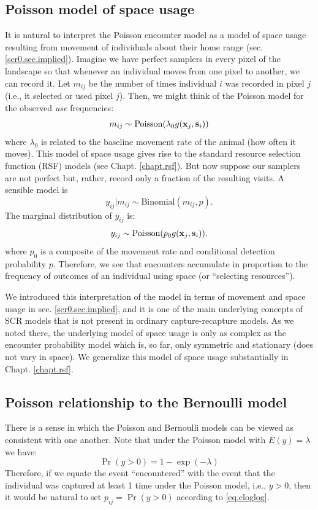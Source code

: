 \subsection{Poisson model of space usage}

It is natural to interpret the Poisson encounter model as a model of
space usage
resulting from movement of individuals
about their home range (sec. \ref{scr0.sec.implied}).  Imagine we have
perfect samplers in every pixel of the landscape so that whenever an
individual moves from one pixel to another, we can record it.
Let $m_{ij}$ be the number of
times individual $i$ was recorded in pixel $j$ (i.e., it selected or
used pixel $j$). Then, 
we might think of the Poisson model for the observed {\it use} frequencies:
\[
m_{ij} \sim  \mbox{Poisson}( \lambda_{0} g({\bf x}_{j},{\bf s}_{i}) )
\]
where $\lambda_{0}$ is related to the baseline movement rate of the
animal (how often it moves). This model of
space usage gives rise to the standard resource selection function
(RSF) models (see Chapt. \ref{chapt.rsf}).
But now suppose our samplers are not perfect but, rather, record only
a fraction of the resulting visits. A sensible model is
\[
 y_{ij}|m_{ij} \sim \mbox{Binomial}(m_{ij}, p).
\]
The marginal distribution of $y_{ij}$ is:
\[
 y_{ij} \sim \mbox{Poisson}(p_{0} g({\bf x}_{j},{\bf s}_{i}) ).
\]
where $p_0$ is a composite of the movement rate and conditional
detection probability $p$. Therefore, we see that encounters
accumulate in proportion to the frequency of outcomes of an individual
using space (or ``selecting resources'').

We introduced this interpretation of the model in terms of movement
and space usage in sec. \ref{scr0.sec.implied}, and it is one of the
main underlying concepts of SCR models that is not present in ordinary
capture-recapture models. As we noted there, the underlying model of
space usage is only as complex as the encounter probability 
model which is, so far, only symmetric and stationary (does not vary
in space). We generalize this model of space usage substantially in
Chapt. \ref{chapt.rsf}.



\subsection{Poisson relationship to the Bernoulli model}
\label{poisson-mn.sec.approx}

There is a sense in which the Poisson and Bernoulli models can be
viewed as consistent with one another. Note that under the Poisson
model with $E(y) = \lambda$ we have:
\begin{equation}
 \Pr(y>0) = 1-\exp(-\lambda)
\label{eq.cloglog}
\end{equation}
Therefore, if we equate the event ``encountered'' with the event that
the individual was captured at least 1 time under the Poisson model,
i.e., $y>0$, then it would be natural to set $p_{ij} = \Pr(y>0)$
according to \ref{eq.cloglog}.

